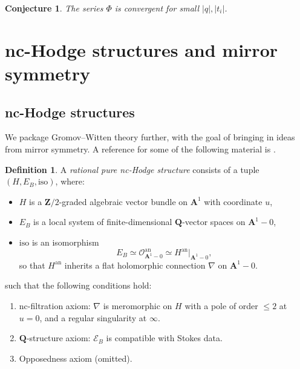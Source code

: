 \documentclass[11pt, reqno]{amsart}
\numberwithin{equation}{section}
\theoremstyle{plain}
\newtheorem{conjecture}[theorem]{Conjecture}
\theoremstyle{definition}
\newtheorem{definition}[theorem]{Definition}
\theoremstyle{italicsname}
\newcommand{\an}{\mathrm{an}}
\newcommand{\cO}{\mathcal{O}}
\newcommand{\cE}{\mathcal{E}}
\newcommand{\bA}{\mathbf{A}}
\newcommand{\bZ}{\mathbf{Z}}
\newcommand{\bQ}{\mathbf{Q}}
\begin{document}
\begin{conjecture}
\label{conj:convergence}
    The series $\Phi$ is convergent for small $|q|, |t_i|$.
\end{conjecture}




\section{nc-Hodge structures and mirror symmetry} %
\label{sec:nc_hodge_structures_and_mirror_symmetry}

\subsection*{nc-Hodge structures} We package Gromov--Witten theory further, with the goal of bringing in ideas from mirror symmetry. A reference for some of the following material is \cite{MR2483750}.

\begin{definition}
\label{def:nc_hodge}
    A \emph{rational pure nc-Hodge structure} consists of a tuple $(H, E_B, \mathrm{iso})$, where:
    \begin{itemize}
        \item $H$ is a $\bZ/2$-graded algebraic vector bundle on $\bA^1$ with coordinate $u$,
        \item $E_B$ is a local system of finite-dimensional $\bQ$-vector spaces on $\bA^1 - 0$,
        \item $\mathrm{iso}$ is an isomorphism
        \[
            E_B \simeq \cO_{\bA^1 - 0}^{\an} \simeq H^{\an}|_{\bA^1 - 0},
        \]
        so that $H^{\an}$ inherits a flat holomorphic connection $\nabla$ on $\bA^1 - 0$.
    \end{itemize}
    such that the following conditions hold:
    \begin{enumerate} [label = (\arabic*)]
        \item nc-filtration axiom: $\nabla$ is meromorphic on $H$ with a pole of order $\leq 2$ at $ u = 0$, and a regular singularity at $\infty$.
        \item $\bQ$-structure axiom: $\cE_B$ is compatible with Stokes data. 
        \item Opposedness axiom (omitted).
    \end{enumerate}
\end{definition}
\end{document}

